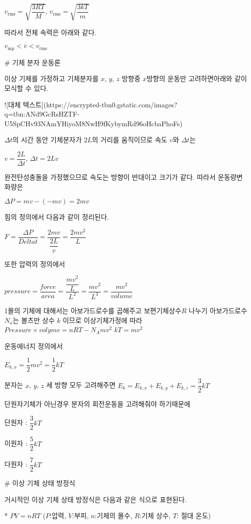 $v_{\mathrm {rms} }={\sqrt {\dfrac {3RT}{M}}}$, $v_{\mathrm {rms} } = {\sqrt {\dfrac {3kT}{m}}}$


따라서 전체 속력은 아래와 같다.

$v_{\mathrm{mp}}<\overline{v} <v_{\mathrm {rms} }$


# 기체 분자 운동론

이상 기체를 가정하고 기체분자를 $x$, $y$, $z$ 방향중 $x$방향의 운동만 고려하면아래와 같이 모식할 수 있다.

![대체 텍스트](https://encrypted-tbn0.gstatic.com/images?q=tbn:ANd9GcRsHZTF-U5SpCHv93NAmYHiyoM8NwH9fKybymRd96oHcbaPhoFs)

$\Delta t$의 시간 동안 기체분자가 $2L$의 거리를 움직이므로 속도 $v$와 $\Delta t$는

$ v = \dfrac{2L}{\Delta t} $, $\Delta t = {2L}{v}$

완전탄성충돌을 가정했으므로 속도는 방향이 반대이고 크기가 같다. 따라서 운동량변화량은 

$\Delta P = mv - (-mv) = 2mv$

힘의 정의에서 다음과 같이 정리된다.

$F = \dfrac{\Delta P}{Delta t} = \dfrac{2mv}{\dfrac{2L}{v}} = \dfrac{2mv^2}{L}$

또한 압력의 정의에서

$ pressure = \dfrac{force}{area} = \dfrac{\dfrac{mv^2}{L}}{L^2} = \dfrac{mv^2}{L^3} = \dfrac {mv^2}{volume}$

1몰의 기체에 대해서는 아보가드로수를 곱해주고 보편기체상수$R$ 나누기 아보가드로수 $N_a$는 볼츠만 상수 $k$ 이므로 이상기체가정에 따라
$Pressure \times volyme = nRT - N_{A} mv^2$
$kT = mv^2$

운동에너지 정의에서

$E_{k, x} = \dfrac{1}{2} mv^2 = \dfrac{1}{2} kT$

분자는 $x$, $y$, $z$ 세 방향 모두 고려해주면
$E_{k} = E_{k, x} + E_{k, y} + E_{k, z} = \dfrac{3}{2} kT$

단원자기체가 아닌경우 분자의 회전운동을 고려해줘야 하기때문에

단원자 : $\dfrac{3}{2} kT$

이원자 : $\dfrac{5}{2} kT$

다원자 : $\dfrac{7}{2} kT$



# 이상 기체 상태 방정식

거시적인 이상 기체 상태 방정식은 다음과 같은 식으로 표현된다. 

*  $ PV = nRT $
($P$:압력, $V$:부피, $n$:기체의 몰수, $R$:기체 상수, $T$: 절대 온도)

